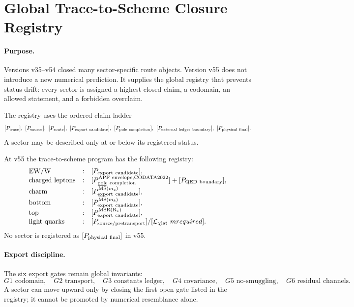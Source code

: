 \section{Global Trace-to-Scheme Closure Registry}
\label{sec:global-trace-to-scheme-registry-v55}

\paragraph{Purpose.}
Versions v35--v54 closed many sector-specific route objects.  Version v55 does
not introduce a new numerical prediction.  It supplies the global registry that
prevents status drift: every sector is assigned a highest closed claim, a
codomain, an allowed statement, and a forbidden overclaim.

\begin{definition}
The registry uses the ordered claim ladder
\[
[P_{\rm trace}],\ [P_{\rm source}],\ [P_{\rm route}],\
[P_{\rm export\ candidate}],\ [P_{\rm pole\ completion}],\
[P_{\rm external\ ledger\ boundary}],\ [P_{\rm physical\ final}].
\]
A sector may be described only at or below its registered status.
\end{definition}

\begin{theorem}
At v55 the trace-to-scheme program has the following registry:
\[
\begin{array}{lll}
\text{EW/W} &:& [P_{\rm export\ candidate}],\\
\text{charged leptons} &:& [P_{\rm pole\ completion}^{\rm APF\ envelope,CODATA2022}]
+[P_{\rm QED\ boundary}],\\
\text{charm} &:& [P_{\rm export\ candidate}^{\overline{\rm MS}(m_c)}],\\
\text{bottom} &:& [P_{\rm export\ candidate}^{\overline{\rm MS}(m_b)}],\\
\text{top} &:& [P_{\rm export\ candidate}^{\rm MSR(R_\star)}],\\
\text{light quarks} &:& [P_{\rm source/pretransport}]/[\mathcal L_{\chi{\rm lat}}\ {
m required}].
\end{array}
\]
No sector is registered as \([P_{\rm physical\ final}]\) in v55.
\end{theorem}

\paragraph{Export discipline.}
The six export gates remain global invariants:
\[
G1\text{ codomain},\quad G2\text{ transport},\quad
G3\text{ constants ledger},\quad G4\text{ covariance},\quad
G5\text{ no-smuggling},\quad G6\text{ residual channels}.
\]
A sector can move upward only by closing the first open gate listed in the
registry; it cannot be promoted by numerical resemblance alone.


